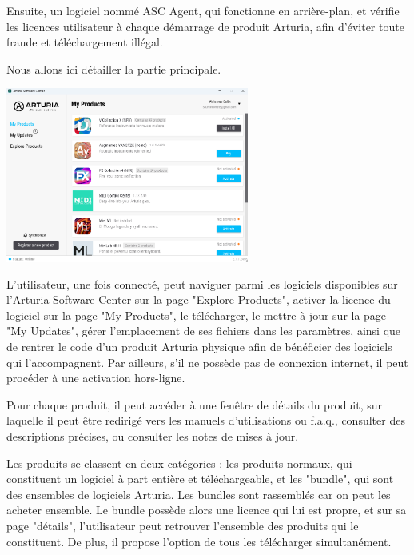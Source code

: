 \documentclass[francais]{rapportPFE}  %
\begin{document}
Ensuite, un logiciel nommé ASC Agent, qui fonctionne en arrière-plan, et vérifie les licences utilisateur à chaque démarrage de produit Arturia, afin d'éviter toute fraude et téléchargement illégal.

Nous allons ici détailler la partie principale.

\begin{center}
	\centering
	\includegraphics[width=0.6\textwidth]{graphics/asc_existant.png}
	\begin{tiny}
	\end{tiny}
	\label{fig}
\end{center}

L'utilisateur, une fois connecté, peut naviguer parmi les logiciels disponibles sur l'Arturia Software Center sur la page "Explore Products", activer la licence du logiciel sur la page "My Products", le télécharger, le mettre à jour sur la page "My Updates", gérer l'emplacement de ses fichiers dans les paramètres, ainsi que de rentrer le code d'un produit Arturia physique afin de bénéficier des logiciels qui l'accompagnent.  Par ailleurs, s'il ne possède pas de connexion internet, il peut procéder à une activation hors-ligne. 

Pour chaque produit, il peut accéder à une fenêtre de détails du produit, sur laquelle il peut être redirigé vers les manuels d'utilisations ou f.a.q., consulter des descriptions précises, ou consulter les notes de mises à jour. 

Les produits se classent en deux catégories : les produits normaux, qui constituent un logiciel à part entière et téléchargeable, et les "bundle", qui sont des ensembles de logiciels Arturia. Les bundles sont rassemblés car on peut les acheter ensemble. Le bundle possède alors une licence qui lui est propre, et sur sa page "détails", l'utilisateur peut retrouver l'ensemble des produits qui le constituent. De plus, il propose l'option de tous les télécharger simultanément.
\end{document}
